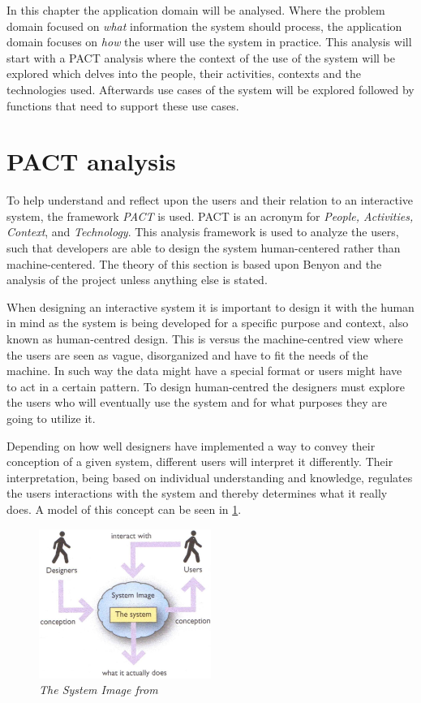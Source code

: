 
In this chapter the application domain will be analysed.
Where the problem domain focused on \textit{what} information the system should process, the application domain focuses on \textit{how} the user will use the system in practice.
This analysis will start with a PACT analysis where the context of the use of the system will be explored which delves into the people, their activities, contexts and the technologies used.
Afterwards use cases of the system will be explored followed by functions that need to support these use cases.

\section{PACT analysis}\label{sec:PACT}
To help understand and reflect upon the users and their relation to an interactive system, the framework \textit{PACT} is used.
PACT is an acronym for \textit{People, Activities, Context}, and \textit{Technology}.
This analysis framework is used to analyze the users, such that developers are able to design the system human-centered rather than machine-centered.
The theory of this section is based upon Benyon \cite{Benyon} and the analysis of the project unless anything else is stated.

When designing an interactive system it is important to design it with the human in mind as the system is being developed for a specific purpose and context, also known as human-centred design.
This is versus the machine-centred view where the users are seen as vague, disorganized and have to fit the needs of the machine. In such way the data might have a special format or users might have to act in a certain pattern.
To design human-centred the designers must explore the users who will eventually use the system and for what purposes they are going to utilize it.

Depending on how well designers have implemented a way to convey their conception of a given system, different users will interpret it differently.
Their interpretation, being based on individual understanding and knowledge, regulates the users interactions with the system and thereby determines what it really does.
A model of this concept can be seen in \cref{fig:PACT-SystemImage}.

\begin{figure}[H]
	\centering
	\includegraphics[width=0.5\textwidth]{billeder/SystemImage-Benyon.jpg}
	\caption{\textit{The System Image from \citep[p.~31]{Benyon}}}
	\label{fig:PACT-SystemImage}
\end{figure}

